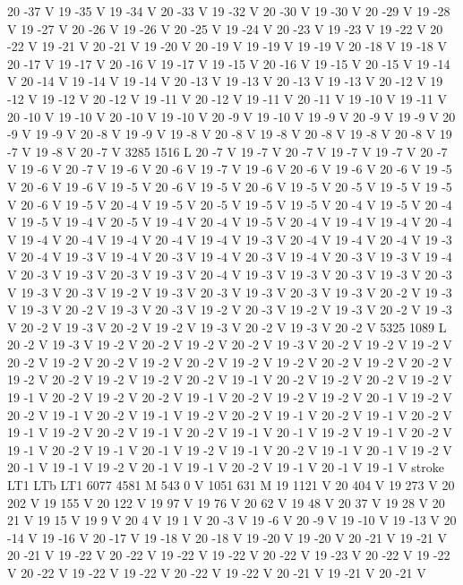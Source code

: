 {{20 -37 V
19 -35 V
19 -34 V
20 -33 V
19 -32 V
20 -30 V
19 -30 V
20 -29 V
19 -28 V
19 -27 V
20 -26 V
19 -26 V
20 -25 V
19 -24 V
20 -23 V
19 -23 V
19 -22 V
20 -22 V
19 -21 V
20 -21 V
19 -20 V
20 -19 V
19 -19 V
19 -19 V
20 -18 V
19 -18 V
20 -17 V
19 -17 V
20 -16 V
19 -17 V
19 -15 V
20 -16 V
19 -15 V
20 -15 V
19 -14 V
20 -14 V
19 -14 V
19 -14 V
20 -13 V
19 -13 V
20 -13 V
19 -13 V
20 -12 V
19 -12 V
19 -12 V
20 -12 V
19 -11 V
20 -12 V
19 -11 V
20 -11 V
19 -10 V
19 -11 V
20 -10 V
19 -10 V
20 -10 V
19 -10 V
20 -9 V
19 -10 V
19 -9 V
20 -9 V
19 -9 V
20 -9 V
19 -9 V
20 -8 V
19 -9 V
19 -8 V
20 -8 V
19 -8 V
20 -8 V
19 -8 V
20 -8 V
19 -7 V
19 -8 V
20 -7 V
3285 1516 L
20 -7 V
19 -7 V
20 -7 V
19 -7 V
19 -7 V
20 -7 V
19 -6 V
20 -7 V
19 -6 V
20 -6 V
19 -7 V
19 -6 V
20 -6 V
19 -6 V
20 -6 V
19 -5 V
20 -6 V
19 -6 V
19 -5 V
20 -6 V
19 -5 V
20 -6 V
19 -5 V
20 -5 V
19 -5 V
19 -5 V
20 -6 V
19 -5 V
20 -4 V
19 -5 V
20 -5 V
19 -5 V
19 -5 V
20 -4 V
19 -5 V
20 -4 V
19 -5 V
19 -4 V
20 -5 V
19 -4 V
20 -4 V
19 -5 V
20 -4 V
19 -4 V
19 -4 V
20 -4 V
19 -4 V
20 -4 V
19 -4 V
20 -4 V
19 -4 V
19 -3 V
20 -4 V
19 -4 V
20 -4 V
19 -3 V
20 -4 V
19 -3 V
19 -4 V
20 -3 V
19 -4 V
20 -3 V
19 -4 V
20 -3 V
19 -3 V
19 -4 V
20 -3 V
19 -3 V
20 -3 V
19 -3 V
20 -4 V
19 -3 V
19 -3 V
20 -3 V
19 -3 V
20 -3 V
19 -3 V
20 -3 V
19 -2 V
19 -3 V
20 -3 V
19 -3 V
20 -3 V
19 -3 V
20 -2 V
19 -3 V
19 -3 V
20 -2 V
19 -3 V
20 -3 V
19 -2 V
20 -3 V
19 -2 V
19 -3 V
20 -2 V
19 -3 V
20 -2 V
19 -3 V
20 -2 V
19 -2 V
19 -3 V
20 -2 V
19 -3 V
20 -2 V
5325 1089 L
20 -2 V
19 -3 V
19 -2 V
20 -2 V
19 -2 V
20 -2 V
19 -3 V
20 -2 V
19 -2 V
19 -2 V
20 -2 V
19 -2 V
20 -2 V
19 -2 V
20 -2 V
19 -2 V
19 -2 V
20 -2 V
19 -2 V
20 -2 V
19 -2 V
20 -2 V
19 -2 V
19 -2 V
20 -2 V
19 -1 V
20 -2 V
19 -2 V
20 -2 V
19 -2 V
19 -1 V
20 -2 V
19 -2 V
20 -2 V
19 -1 V
20 -2 V
19 -2 V
19 -2 V
20 -1 V
19 -2 V
20 -2 V
19 -1 V
20 -2 V
19 -1 V
19 -2 V
20 -2 V
19 -1 V
20 -2 V
19 -1 V
20 -2 V
19 -1 V
19 -2 V
20 -2 V
19 -1 V
20 -2 V
19 -1 V
20 -1 V
19 -2 V
19 -1 V
20 -2 V
19 -1 V
20 -2 V
19 -1 V
20 -1 V
19 -2 V
19 -1 V
20 -2 V
19 -1 V
20 -1 V
19 -2 V
20 -1 V
19 -1 V
19 -2 V
20 -1 V
19 -1 V
20 -2 V
19 -1 V
20 -1 V
19 -1 V
stroke
LT1
LTb
LT1
6077 4581 M
543 0 V
1051 631 M
19 1121 V
20 404 V
19 273 V
20 202 V
19 155 V
20 122 V
19 97 V
19 76 V
20 62 V
19 48 V
20 37 V
19 28 V
20 21 V
19 15 V
19 9 V
20 4 V
19 1 V
20 -3 V
19 -6 V
20 -9 V
19 -10 V
19 -13 V
20 -14 V
19 -16 V
20 -17 V
19 -18 V
20 -18 V
19 -20 V
19 -20 V
20 -21 V
19 -21 V
20 -21 V
19 -22 V
20 -22 V
19 -22 V
19 -22 V
20 -22 V
19 -23 V
20 -22 V
19 -22 V
20 -22 V
19 -22 V
19 -22 V
20 -22 V
19 -22 V
20 -21 V
19 -21 V
20 -21 V
}}
